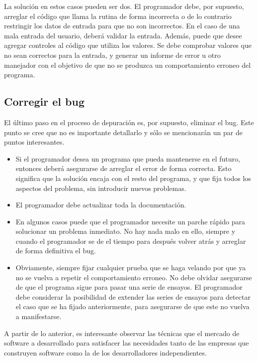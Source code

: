 \documentclass[12pt,legalpaper]{report}
\begin{document}
La solución en estos casos pueden ser dos. El programador debe, por supuesto, arreglar el código que llama la rutina de forma incorrecta o de lo contrario restringir los datos de entrada para que no son incorrectos. En el caso de una mala entrada del usuario, deberá validar la entrada. Además, puede que desee agregar controles al código que utiliza los valores.  Se debe comprobar valores que no sean correctos para la entrada, y generar un informe de error u otro manejador con el objetivo de que no se produzca un comportamiento erroneo del programa.


\subsection{Corregir el bug}

El último paso en el proceso de depuración es, por supuesto, eliminar el bug. Este punto se cree que no es importante detallarlo y sólo se mencionarán un par de puntos interesantes.

\begin{itemize}
    \item Si el programador desea un programa que pueda mantenerse en el futuro, entonces deberá asegurarse de arreglar el error de forma correcta. Esto significa que la solución encaja con el resto del programa, y que fija todos los aspectos del problema, sin introducir nuevos problemas. 

    \item El programador debe actualizar toda la documentación. 

    \item En algunos casos puede que el programador necesite un parche rápido para solucionar un problema inmediato. No hay nada malo en ello, siempre y cuando el programador se de el tiempo para después volver atrás y arreglar de forma definitiva el bug. 

    \item Obviamente, siempre fijar cualquier prueba que se haga velando por que ya no se vuelva a repetir el comportamiento erroneo. No debe olvidar asegurarse de que el programa sigue para pasar una serie de ensayos. El programador debe considerar la posibilidad de extender las series de ensayos para detectar el caso que se ha fijado anteriormente, para asegurarse de que este no vuelva a manifestarse.
\end{itemize}

A partir de lo anterior, es interesante observar las técnicas que el mercado de software a desarrollado para satisfacer las necesidades tanto de las empresas que construyen software como la de los desarrolladores independientes.
\end{document}
